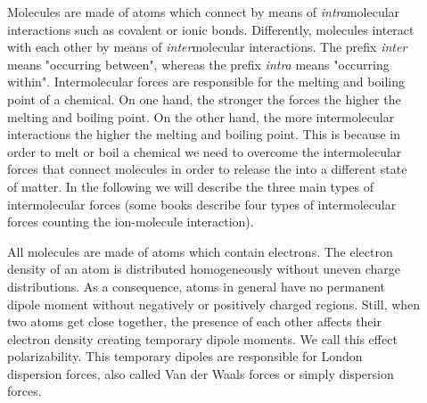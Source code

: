 \documentclass[main.tex]{subfiles}
\begin{document}
\sloppy 
\begin{description}

\item[] Molecules are made of atoms which connect by means of \emph{intra}molecular interactions such as covalent or ionic bonds. Differently, molecules interact with each other by means of \emph{inter}molecular interactions. The prefix \emph{inter} means "occurring between", whereas the prefix \emph{intra} means "occurring within". Intermolecular forces are responsible for the melting and boiling point of a chemical. On one hand, the stronger the forces the higher the melting and boiling point. On the other hand, the more intermolecular interactions the higher the melting and boiling point. This is because in order to melt or boil a chemical we need to overcome the intermolecular forces that connect molecules in order to release the into a different state of matter. In the following we will describe the three main types of intermolecular forces (some books describe four types of intermolecular forces counting the ion-molecule interaction).



\item[] All molecules are made of atoms which contain electrons. The electron density of an atom is distributed homogeneously without uneven charge distributions. As a consequence, atoms in general have no permanent dipole moment without negatively or positively charged regions. Still, when two atoms get close together, the presence of each other affects their electron density creating temporary dipole moments. We call this effect polarizability. This temporary dipoles are responsible for London dispersion forces, also called Van der Waals forces or simply dispersion forces.

 \begin{marginfigure}[0cm]
 

\end{marginfigure}
\end{description}
\end{document}

